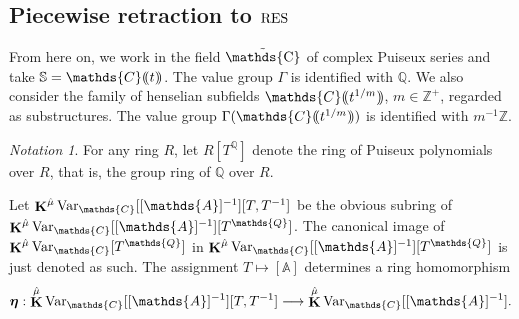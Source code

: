 \documentclass[12pt]{amsart}
\theoremstyle{plain}
\theoremstyle{definition}
\theoremstyle{remark}
\newtheorem{nota}[thm]{Notation}
\numberwithin{equation}{section}
\theoremstyle{plain}
\newcommand{\RV}{\textup{RV}}
\newcommand{\Z}{\mathds{Z}}
\newcommand{\A}{\mathds{A}}
\newcommand{\C}{\mathds{C}}
\newcommand{\Q}{\mathds{Q}}
\newcommand{\gR}{\mathfrak{R}}
\newcommand{\gG}{\mathfrak{G}}
\newcommand{\0}{\emptyset}
\newcommand{\dpar}[1]{%
   (\mkern-4mu (#1 )\mkern-4mu )}
\newcommand{\mdl}[1]{\mathcal{#1}}  %
\newcommand{\fun}{\longrightarrow}
\newcommand{\efun}{\longmapsto}
\newcommand{\mgRV}{{\mu}{\RV}}
\newcommand{\mG}{{\mu}{\Gamma}}
\newcommand{\RES}{\textup{RES}}
\newcommand{\mgRES}{{\mu}{\RES}}
\DeclareMathOperator{\gsk}{\mathbf{K}_+}
\DeclareMathOperator{\ggk}{\mathbf{K}}
\DeclareMathOperator{\fin}{fin}
\newcommand{\var}{\textup{Var}}
\DeclareMathOperator{\puC}{\tilde \C}
\newcommand{\gmv}{\ggk^{\hat \mu}\var_{\C}}
\begin{document}


\subsection{Piecewise retraction to $\RES$}\label{piece:res}

From here on, we work in the field $\puC$ of complex Puiseux series and take  $\mathbb{S} = \C \dpar{ t }$. The value group $\Gamma$ is identified with $\Q$. We also consider the family of henselian subfields $\C \dpar{ t^{1/m} }$,  $m \in \Z^+$, regarded as substructures. The value group $\Gamma(\C \dpar{ t^{1/m} })$ is identified with $m^{-1} \Z$.


\begin{nota}\label{loc:rings}
For any ring $R$, let $R[T^{\Q}]$ denote the ring of Puiseux polynomials over $R$, that is, the group ring of $\Q$ over $R$.

Let $\gmv[[\A]^{-1}][T,T^{-1}]$ be the obvious subring of $\gmv[[\A]^{-1}][T^{\Q}]$. The canonical image of $\gmv [T^{\Q}]$ in  $\gmv[[\A]^{-1}][T^{\Q}]$ is just denoted as such. The assignment $T \efun [\A]$ determines a ring homomorphism
\begin{equation}\label{pui:laurent}
  \bm \eta : \gmv[[\A]^{-1}][T,T^{-1}] \fun \gmv[[\A]^{-1}].
\end{equation}
\end{nota}

\end{document}
